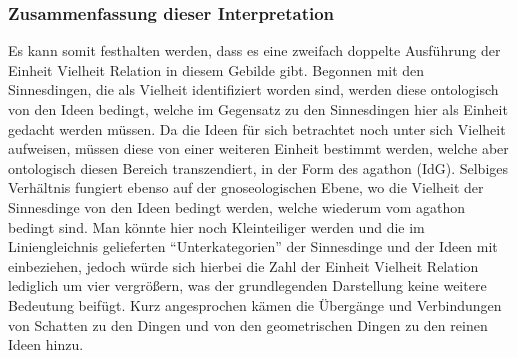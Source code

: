 \subsubsection*{Zusammenfassung dieser Interpretation}
Es kann somit festhalten werden, dass es eine zweifach doppelte Ausführung der Einheit Vielheit Relation in diesem Gebilde gibt. 
Begonnen mit den Sinnesdingen, die als Vielheit identifiziert worden sind, werden diese ontologisch von den Ideen bedingt, welche im Gegensatz zu den Sinnesdingen hier als Einheit gedacht werden müssen. Da die Ideen für sich betrachtet noch unter sich Vielheit aufweisen, müssen diese von einer weiteren Einheit bestimmt werden, welche aber ontologisch diesen Bereich transzendiert, in der Form des agathon (IdG). Selbiges Verhältnis fungiert ebenso auf der gnoseologischen Ebene, wo die Vielheit der Sinnesdinge von den Ideen bedingt werden, welche wiederum vom agathon bedingt sind. Man könnte hier noch Kleinteiliger werden und die im Liniengleichnis gelieferten \enquote{Unterkategorien} der Sinnesdinge und der Ideen mit einbeziehen, jedoch würde sich hierbei die Zahl der Einheit Vielheit Relation lediglich um vier vergrößern, was der grundlegenden Darstellung keine weitere Bedeutung beifügt. Kurz angesprochen kämen die Übergänge und Verbindungen von Schatten zu den Dingen und von den geometrischen Dingen zu den reinen Ideen hinzu. 



